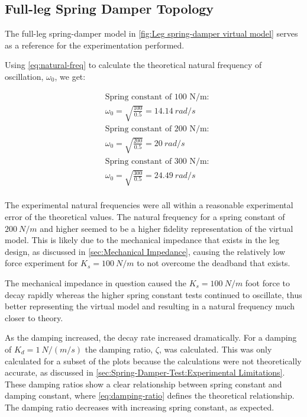\subsection{Full-leg Spring Damper Topology}

The full-leg spring-damper model in \cref{fig:Leg spring-damper virtual model} serves as a reference for the experimentation performed.

Using \cref{eq:natural-freq} to calculate the theoretical natural frequency of oscillation, $\omega_0$, we get:

\begin{equation}
\begin{aligned}
&\text{Spring constant of 100 N/m:}\\
&\omega_0 = \sqrt{\frac{100}{0.5}} = 14.14\ rad/s\\
&\text{Spring constant of 200 N/m:}\\
&\omega_0 = \sqrt{\frac{200}{0.5}} = 20\ rad/s\\
&\text{Spring constant of 300 N/m:}\\
&\omega_0 = \sqrt{\frac{300}{0.5}} = 24.49\ rad/s\\
\end{aligned}
\end{equation}

The experimental natural frequencies were all within a reasonable experimental error of the theoretical values. The natural frequency for a spring constant of $200\ N/m$ and higher seemed to be a higher fidelity representation of the virtual model. This is likely due to the mechanical impedance that exists in the leg design, as discussed in \cref{sec:Mechanical Impedance}, causing the relatively low force experiment for $K_s = 100\ N/m$ to not overcome the deadband that exists. 

The mechanical impedance in question caused the $K_s = 100\ N/m$ foot force to decay rapidly whereas the higher spring constant tests continued to oscillate, thus better representing the virtual model and resulting in a natural frequency much closer to theory.

As the damping increased, the decay rate increased dramatically. For a damping of $K_d = 1\ N/(m/s)$ the damping ratio, $\zeta$, was calculated. This was only calculated for a subset of the plots because the calculations were not theoretically accurate, as discussed in \cref{sec:Spring-Damper-Test:Experimental Limitations}. These damping ratios show a clear relationship between spring constant and damping constant, where \cref{eq:damping-ratio} defines the theoretical relationship. The damping ratio decreases with increasing spring constant, as expected.

